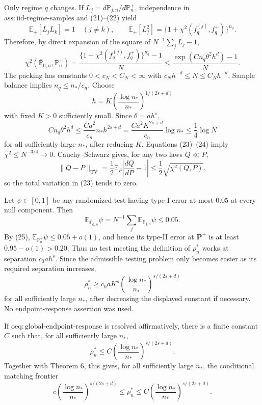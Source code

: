 Only regime \(q\) changes.  If \(L_j=d\mathbb P_{j,n}/d\mathbb P_n^+\), independence in \(\mathrm{ass:iid\text{-}regime\text{-}samples}\) and (21)--(22) yield
\[
 \mathbb E_+[L_jL_k]=1\quad(j\ne k),
 \qquad
 \mathbb E_+[L_j^2]=\{1+\chi^2(f_q^{(j)},f_q^+)\}^{n_q}.
\]
Therefore, by direct expansion of the square of \(N^{-1}\sum_jL_j-1\),
\[
 \chi^2(\overline{\mathbb P}_{0,n},\mathbb P_n^+)
 =\frac{\{1+\chi^2(f_q^{(j)},f_q^+)\}^{n_q}-1}{N}
 \le\frac{\exp(Cn_q\theta^2h^d)-1}{N}.
 \tag{23}
\]
The packing has constants \(0<c_N<C_N<\infty\) with \(c_Nh^{-d}\le N\le C_Nh^{-d}\).  Sample balance implies \(n_q\le n_\ast/c_n\).  Choose
\[
 h=K\left(\frac{\log n_\ast}{n_\ast}\right)^{1/(2s+d)}
\]
with fixed \(K>0\) sufficiently small.  Since \(\theta=ah^s\),
\[
 Cn_q\theta^2h^d
 \le \frac{Ca^2}{c_n}n_\ast h^{2s+d}
 =\frac{Ca^2K^{2s+d}}{c_n}\log n_\ast
 \le\frac14\log N
 \tag{24}
\]
for all sufficiently large \(n_\ast\), after reducing \(K\).  Equations (23)--(24) imply \(\chi^2\le N^{-3/4}\to0\).  Cauchy--Schwarz gives, for any two laws \(Q\ll P\),
\[
 \lVert Q-P\rVert_{\mathrm{TV}}
 =\frac12\mathbb E_P\left\lvert\frac{dQ}{dP}-1\right\rvert
 \le\frac12\sqrt{\chi^2(Q,P)},
 \tag{25}
\]
so the total variation in (23) tends to zero.

Let \(\psi\in[0,1]\) be any randomized test having type-I error at most \(0.05\) at every null component.  Then
\[
 \mathbb E_{\overline{\mathbb P}_{0,n}}\psi
 =N^{-1}\sum_j\mathbb E_{\mathbb P_{j,n}}\psi\le0.05.
\]
By (25), \(\mathbb E_{\mathbb P_n^+}\psi\le0.05+o(1)\), and hence its type-II error at \(\mathbf P^+\) is at least \(0.95-o(1)>0.20\).  Thus no test meeting the definition of \(\rho_n^\ast\) works at separation \(c_0ah^s\).  Since the admissible testing problem only becomes easier as its required separation increases,
\[
 \rho_n^\ast\ge c_0aK^s
 \left(\frac{\log n_\ast}{n_\ast}\right)^{s/(2s+d)}
\]
for all sufficiently large \(n_\ast\), after decreasing the displayed constant if necessary.  No endpoint-response assertion was used.

If \(\mathrm{oeq:global\text{-}endpoint\text{-}response}\) is resolved affirmatively, there is a finite constant \(C\) such that, for all sufficiently large \(n_\ast\),
\[
 \rho_n^\ast\le C\left(\frac{\log n_\ast}{n_\ast}\right)^{s/(2s+d)}.
\]
Together with Theorem 6, this gives, for all sufficiently large \(n_\ast\), the conditional matching frontier
\[
 c\left(\frac{\log n_\ast}{n_\ast}\right)^{s/(2s+d)}
 \le\rho_n^\ast\le
 C\left(\frac{\log n_\ast}{n_\ast}\right)^{s/(2s+d)}.
\]

